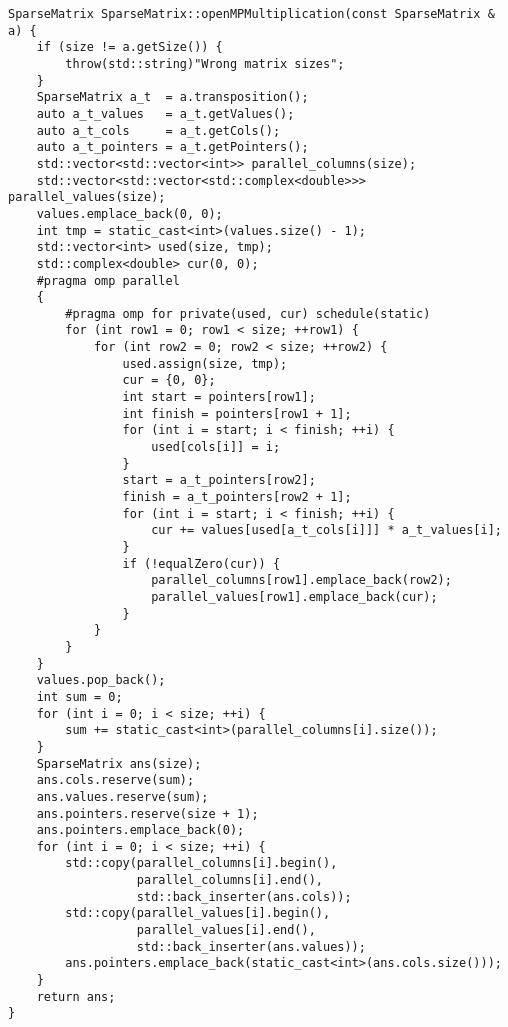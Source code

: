 \documentclass{report}
\begin{document}
\begin{lstlisting}
SparseMatrix SparseMatrix::openMPMultiplication(const SparseMatrix & a) {
    if (size != a.getSize()) {
        throw(std::string)"Wrong matrix sizes";
    }
    SparseMatrix a_t  = a.transposition();
    auto a_t_values   = a_t.getValues();
    auto a_t_cols     = a_t.getCols();
    auto a_t_pointers = a_t.getPointers();
    std::vector<std::vector<int>> parallel_columns(size);
    std::vector<std::vector<std::complex<double>>> parallel_values(size);
    values.emplace_back(0, 0);
    int tmp = static_cast<int>(values.size() - 1);
    std::vector<int> used(size, tmp);
    std::complex<double> cur(0, 0);
    #pragma omp parallel
    {
        #pragma omp for private(used, cur) schedule(static)
        for (int row1 = 0; row1 < size; ++row1) {
            for (int row2 = 0; row2 < size; ++row2) {
                used.assign(size, tmp);
                cur = {0, 0};
                int start = pointers[row1];
                int finish = pointers[row1 + 1];
                for (int i = start; i < finish; ++i) {
                    used[cols[i]] = i;
                }
                start = a_t_pointers[row2];
                finish = a_t_pointers[row2 + 1];
                for (int i = start; i < finish; ++i) {
                    cur += values[used[a_t_cols[i]]] * a_t_values[i];
                }
                if (!equalZero(cur)) {
                    parallel_columns[row1].emplace_back(row2);
                    parallel_values[row1].emplace_back(cur);
                }
            }
        }
    }
    values.pop_back();
    int sum = 0;
    for (int i = 0; i < size; ++i) {
        sum += static_cast<int>(parallel_columns[i].size());
    }
    SparseMatrix ans(size);
    ans.cols.reserve(sum);
    ans.values.reserve(sum);
    ans.pointers.reserve(size + 1);
    ans.pointers.emplace_back(0);
    for (int i = 0; i < size; ++i) {
        std::copy(parallel_columns[i].begin(),
                  parallel_columns[i].end(),
                  std::back_inserter(ans.cols));
        std::copy(parallel_values[i].begin(),
                  parallel_values[i].end(),
                  std::back_inserter(ans.values));
        ans.pointers.emplace_back(static_cast<int>(ans.cols.size()));
    }
    return ans;
}


\end{lstlisting}
\end{document}
